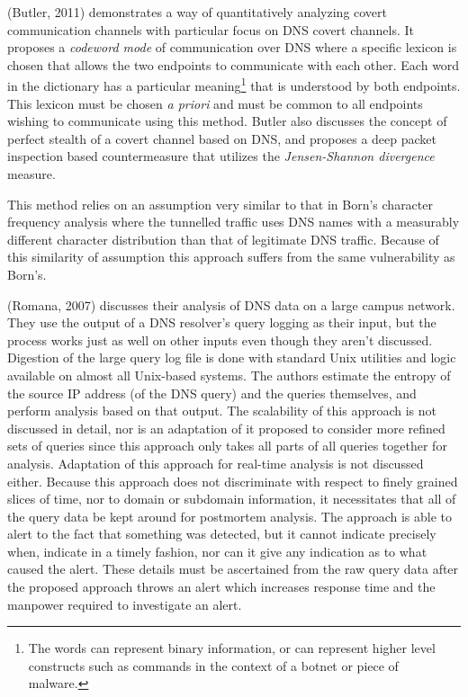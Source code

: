\documentclass[12pt]{report}
\theoremstyle{remark}
\theoremstyle{definition}
\theoremstyle{definition}
\theoremstyle{definition}
\begin{document}
(Butler, 2011)\cite{Butler2011} demonstrates a way of quantitatively analyzing
covert communication channels with particular focus on DNS covert channels. It
proposes a \emph{codeword mode} of communication over DNS where a specific
lexicon is chosen that allows the two endpoints to communicate with each other.
Each word in the dictionary has a particular meaning\footnote{The words can
represent binary information, or can represent higher level constructs such as
commands in the context of a botnet or piece of malware.} that is understood by
both endpoints. This lexicon must be chosen \emph{a priori} and must be common
to all endpoints wishing to communicate using this method. Butler also discusses
the concept of perfect stealth of a covert channel based on DNS, and proposes a
deep packet inspection based countermeasure that utilizes the
\emph{Jensen-Shannon divergence} measure.

This method relies on an assumption very similar to that in Born's character
frequency analysis where the tunnelled traffic uses DNS names with a measurably
different character distribution than that of legitimate DNS traffic. Because of
this similarity of assumption this approach suffers from the same vulnerability
as Born's.

(Romana, 2007)\cite{Romana2007} discusses their analysis of DNS data on a large
campus network. They use the output of a DNS resolver's query logging as their
input, but the process works just as well on other inputs even though they
aren't discussed. Digestion of the large query log file is done with standard
Unix utilities and logic available on almost all Unix-based systems. The authors
estimate the entropy of the source IP address (of the DNS query) and the queries
themselves, and perform analysis based on that output. The scalability of this
approach is not discussed in detail, nor is an adaptation of it proposed to
consider more refined sets of queries since this approach only takes all parts
of all queries together for analysis. Adaptation of this approach for real-time
analysis is not discussed either. Because this approach does not discriminate
with respect to finely grained slices of time, nor to domain or subdomain
information, it necessitates that all of the query data be kept around for
postmortem analysis. The approach is able to alert to the fact that something
was detected, but it cannot indicate precisely when, indicate in a timely
fashion, nor can it give any indication as to what caused the alert. These
details must be ascertained from the raw query data after the proposed approach
throws an alert which increases response time and the manpower required to
investigate an alert.
\end{document}
